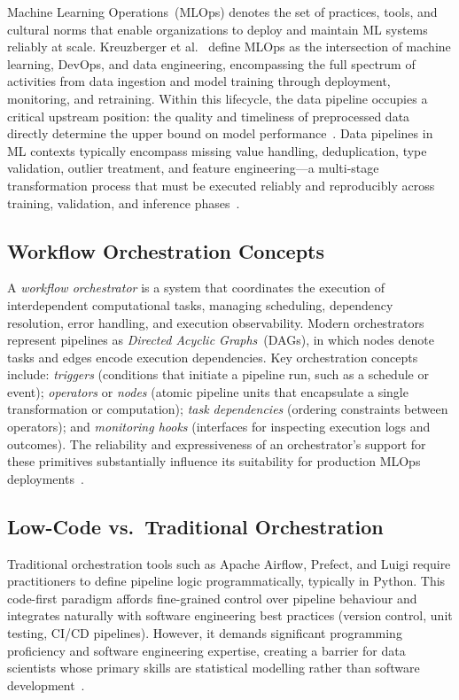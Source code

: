 \documentclass[journal]{IEEEtran}
\begin{document}
Machine Learning Operations~(MLOps) denotes the set of practices, tools,
and cultural norms that enable organizations to deploy and maintain ML
systems reliably at scale. Kreuzberger et al.~\cite{kreuzberger2023mlops}
define MLOps as the intersection of machine learning, DevOps, and data
engineering, encompassing the full spectrum of activities from data
ingestion and model training through deployment, monitoring, and
retraining. Within this lifecycle, the data pipeline occupies a critical
upstream position: the quality and timeliness of preprocessed data
directly determine the upper bound on model performance~\cite{whang2023data}.
Data pipelines in ML contexts typically encompass missing value handling,
deduplication, type validation, outlier treatment, and feature
engineering---a multi-stage transformation process that must be executed
reliably and reproducibly across training, validation, and inference
phases~\cite{breck2017ml}.

\subsection{Workflow Orchestration Concepts}

A \textit{workflow orchestrator} is a system that coordinates the
execution of interdependent computational tasks, managing scheduling,
dependency resolution, error handling, and execution observability.
Modern orchestrators represent pipelines as \textit{Directed Acyclic
Graphs}~(DAGs), in which nodes denote tasks and edges encode execution
dependencies. Key orchestration concepts include: \textit{triggers}
(conditions that initiate a pipeline run, such as a schedule or event);
\textit{operators} or \textit{nodes} (atomic pipeline units that encapsulate
a single transformation or computation); \textit{task dependencies}
(ordering constraints between operators); and \textit{monitoring hooks}
(interfaces for inspecting execution logs and outcomes). The reliability
and expressiveness of an orchestrator's support for these primitives
substantially influence its suitability for production MLOps
deployments~\cite{symeonidis2022mlops}.

\subsection{Low-Code vs.\ Traditional Orchestration}

Traditional orchestration tools such as Apache Airflow, Prefect, and Luigi
require practitioners to define pipeline logic programmatically, typically
in Python. This code-first paradigm affords fine-grained control over
pipeline behaviour and integrates naturally with software engineering
best practices (version control, unit testing, CI/CD pipelines). However,
it demands significant programming proficiency and software engineering
expertise, creating a barrier for data scientists whose primary skills are
statistical modelling rather than software development~\cite{amershi2019software}.
\end{document}
